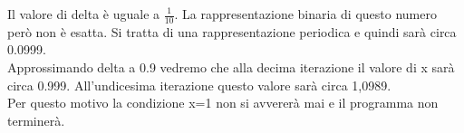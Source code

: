 
Il valore di delta è uguale a \(\frac{1}{10}\). La rappresentazione binaria di questo numero però non è esatta.
Si tratta di una rappresentazione periodica e quindi sarà circa 0.0999.\\
Approssimando delta a 0.9 vedremo che alla decima iterazione il valore di x sarà circa 0.999.
All'undicesima iterazione questo valore sarà circa 1,0989.\\ Per questo motivo la condizione x=1 non si avvererà mai e il programma non terminerà.
